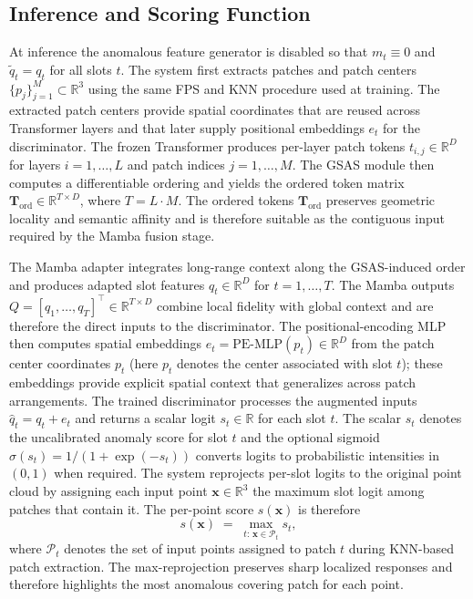 \subsection{Inference and Scoring Function}

At inference the anomalous feature generator is disabled so that \(m_t\equiv 0\) and \(\tilde{q}_t=q_t\) for all slots \(t\). The system first extracts patches and patch centers \(\{p_j\}_{j=1}^M\subset\mathbb{R}^3\) using the same FPS and KNN procedure used at training. The extracted patch centers provide spatial coordinates that are reused across Transformer layers and that later supply positional embeddings \(e_t\) for the discriminator. The frozen Transformer produces per-layer patch tokens \(t_{i,j}\in\mathbb{R}^D\) for layers \(i=1,\dots,L\) and patch indices \(j=1,\dots,M\). The GSAS module then computes a differentiable ordering and yields the ordered token matrix \(\mathbf{T}_{\mathrm{ord}}\in\mathbb{R}^{T\times D}\), where \(T=L\cdot M\). The ordered tokens \(\mathbf{T}_{\mathrm{ord}}\) preserves geometric locality and semantic affinity and is therefore suitable as the contiguous input required by the Mamba fusion stage.

The Mamba adapter integrates long-range context along the GSAS-induced order and produces adapted slot features \(q_t\in\mathbb{R}^D\) for \(t=1,\dots,T\). The Mamba outputs \(Q=[q_1,\dots,q_T]^\top\in\mathbb{R}^{T\times D}\) combine local fidelity with global context and are therefore the direct inputs to the discriminator. The positional-encoding MLP then computes spatial embeddings \(e_t=\mathrm{PE\text{-}MLP}(p_t)\in\mathbb{R}^D\) from the patch center coordinates \(p_t\) (here \(p_t\) denotes the center associated with slot \(t\)); these embeddings provide explicit spatial context that generalizes across patch arrangements. The trained discriminator processes the augmented inputs \(\hat{q}_t=q_t+e_t\) and returns a scalar logit \(s_t\in\mathbb{R}\) for each slot \(t\). The scalar \(s_t\) denotes the uncalibrated anomaly score for slot \(t\) and the optional sigmoid \(\sigma(s_t)=1/(1+\exp(-s_t))\) converts logits to probabilistic intensities in \((0,1)\) when required. The system reprojects per-slot logits to the original point cloud by assigning each input point \(\mathbf{x}\in\mathbb{R}^3\) the maximum slot logit among patches that contain it. The per-point score \(s(\mathbf{x})\) is therefore
\begin{equation}
s(\mathbf{x}) \;=\; \max_{t:\,\mathbf{x}\in\mathcal{P}_t} s_t,
\end{equation}
where \(\mathcal{P}_t\) denotes the set of input points assigned to patch \(t\) during KNN-based patch extraction. The max-reprojection preserves sharp localized responses and therefore highlights the most anomalous covering patch for each point.

